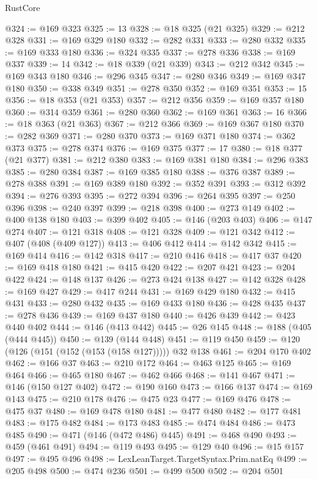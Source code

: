 \begin{lexlean}{RustCore}
\begin{coremodule}
@324 := @169 @323
@325 := 13
@328 := @18 @325 (@21 @325)
@329 := @212 @328
@331 := @169 @329 @180
@332 := @282 @331
@333 := @280 @332
@335 := @169 @333 @180
@336 := @324 @335
@337 := @278 @336
@338 := @169 @337
@339 := 14
@342 := @18 @339 (@21 @339)
@343 := @212 @342
@345 := @169 @343 @180
@346 := @296 @345
@347 := @280 @346
@349 := @169 @347 @180
@350 := @338 @349
@351 := @278 @350
@352 := @169 @351
@353 := 15
@356 := @18 @353 (@21 @353)
@357 := @212 @356
@359 := @169 @357 @180
@360 := @314 @359
@361 := @280 @360
@362 := @169 @361
@363 := 16
@366 := @18 @363 (@21 @363)
@367 := @212 @366
@369 := @169 @367 @180
@370 := @282 @369
@371 := @280 @370
@373 := @169 @371 @180
@374 := @362 @373
@375 := @278 @374
@376 := @169 @375
@377 := 17
@380 := @18 @377 (@21 @377)
@381 := @212 @380
@383 := @169 @381 @180
@384 := @296 @383
@385 := @280 @384
@387 := @169 @385 @180
@388 := @376 @387
@389 := @278 @388
@391 := @169 @389 @180
@392 := @352 @391
@393 := @312 @392
@394 := @276 @393
@395 := @272 @394
@396 := @264 @395
@397 := @250 @396
@398 := @240 @397
@399 := @218 @398
@400 := @273 @149
@402 := @400 @138 @180
@403 := @399 @402
@405 := @146 (@203 @403)
@406 := @147 @274
@407 := @121 @318
@408 := @121 @328
@409 := @121 @342
@412 := @407 (@408 (@409 @127))
@413 := @406 @412
@414 := @142 @342
@415 := @169 @414
@416 := @142 @318
@417 := @210 @416
@418 := @417 @37
@420 := @169 @418 @180
@421 := @415 @420
@422 := @207 @421
@423 := @204 @422
@424 := @148 @137
@426 := @273 @424 @138
@427 := @142 @328
@428 := @169 @427
@429 := @417 @244
@431 := @169 @429 @180
@432 := @415 @431
@433 := @280 @432
@435 := @169 @433 @180
@436 := @428 @435
@437 := @278 @436
@439 := @169 @437 @180
@440 := @426 @439
@442 := @423 @440 @402
@444 := @146 (@413 @442)
@445 := @26 @145
@448 := @188 (@405 (@444 @445))
@450 := @139 (@144 @448)
@451 := @119 @450
@459 := @120 (@126 (@151 (@152 (@153 (@158 @127))))) @32 @138
@461 := @204 @170 @402
@462 := @166 @37
@463 := @210 @172
@464 := @463 @125
@465 := @169 @464
@466 := @465 @180
@467 := @462 @466
@468 := @141 @467
@471 := @146 (@150 @127 @402)
@472 := @190 @160
@473 := @166 @137
@474 := @169 @143
@475 := @210 @178
@476 := @475 @23
@477 := @169 @476
@478 := @475 @37
@480 := @169 @478 @180
@481 := @477 @480
@482 := @177 @481
@483 := @175 @482
@484 := @173 @483
@485 := @474 @484
@486 := @473 @485
@490 := @471 (@146 (@472 @486) @445)
@491 := @468 @490
@493 := @459 (@461 @491)
@494 := @119 @493
@495 := @129 @40
@496 := @15 @157
@497 := @495 @496
@498 := LexLeanTarget.TargetSyntax.Prim.natEq
@499 := @205 @498
@500 := @474 @236
@501 := @499 @500
@502 := @204 @501

\end{coremodule}
\end{lexlean}

